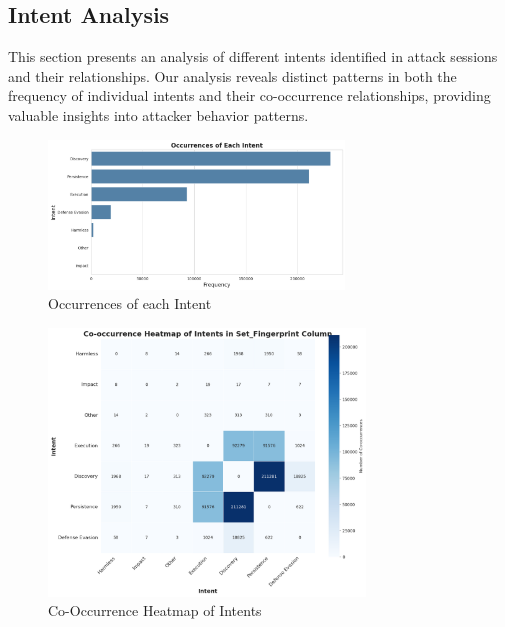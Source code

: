     \subsection{Intent Analysis}
    
        This section presents an analysis of different intents identified in attack sessions and their relationships. Our analysis reveals distinct patterns in both the frequency of individual intents and their co-occurrence relationships, providing valuable insights into attacker behavior patterns.

        \begin{figure}[H]
            \centering
            \includegraphics[width=0.7\textwidth]{../figures/plots/section1/occurrences_of_each_intent.png}
            \caption{Occurrences of each Intent}
            \label{fig:occurrences-of-each-intent}
        \end{figure}
        
        \begin{figure}[H]
            \centering
            \includegraphics[width=0.75\textwidth]{../figures/plots/section1/co-occurrence_heatmap_of_intents_in_set_fingerprint_column.png}
            \caption{Co-Occurrence Heatmap of Intents}
            \label{fig:co-occurrence-heatmap-of-intents}
        \end{figure}

